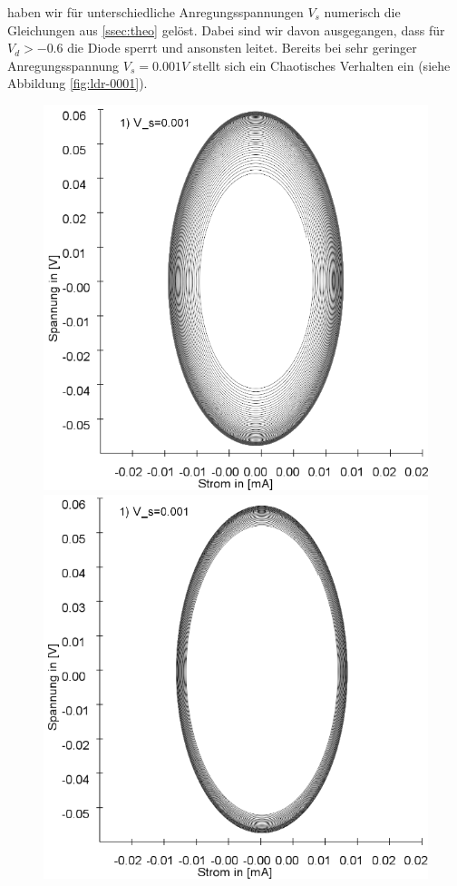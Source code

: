 \documentclass{scrartcl}
\begin{document}
haben wir für unterschiedliche Anregungsspannungen $V_s$ numerisch die Gleichungen aus  \ref{ssec:theo} gelöst. Dabei sind wir davon ausgegangen, dass für $V_d > -0.6$ die Diode sperrt und ansonsten leitet.
\newline
Bereits bei sehr geringer Anregungsspannung $V_s=0.001V$ stellt sich ein Chaotisches Verhalten ein (siehe Abbildung \ref{fig:ldr-0001}).
\begin{figure}
\includegraphics[scale=0.28]{schwing-runge-nach50k-weitere200k-10-9}
\includegraphics[scale=0.28]{schwing-runge-nach100k-weitere200k-10-9}

\end{figure}
\end{document}
